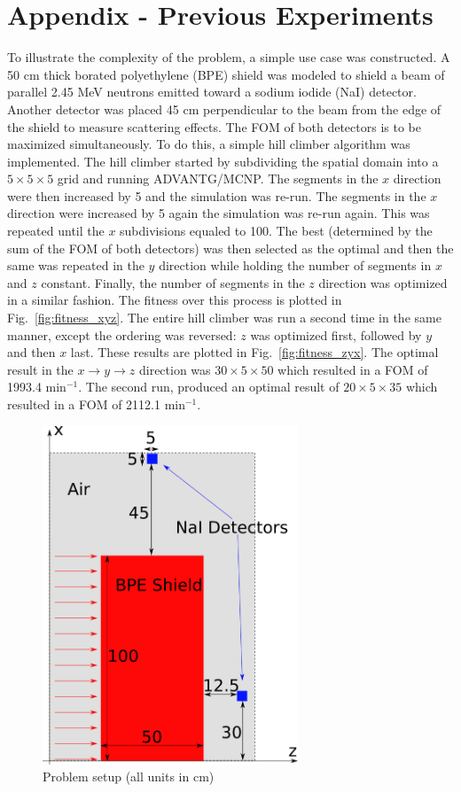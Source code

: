 \documentclass{article}
\begin{document}
\section{Appendix - Previous Experiments}\label{sec:apdx}
To illustrate the complexity of the problem, a simple use case was constructed. A 50 cm thick borated polyethylene (BPE) shield was modeled to shield a beam of parallel 2.45 MeV neutrons emitted toward a sodium iodide (NaI) detector. Another detector was placed 45 cm perpendicular to the beam from the edge of the shield to measure scattering effects. The FOM of both detectors is to be maximized simultaneously. To do this, a simple hill climber algorithm was implemented. The hill climber started by subdividing the spatial domain into a $5 \times 5 \times 5$ grid and running ADVANTG/MCNP. The segments in the $x$ direction were then increased by 5 and the simulation was re-run. The segments in the $x$ direction were increased by 5 again the simulation was re-run again. This was repeated until the $x$ subdivisions equaled to 100. The best (determined by the sum of the FOM of both detectors) was then selected as the optimal and then the same was repeated in the $y$ direction while holding the number of segments in $x$ and $z$ constant. Finally, the number of segments in the $z$ direction was optimized in a similar fashion. The fitness over this process is plotted in Fig.~\ref{fig:fitness_xyz}. The entire hill climber was run a second time in the same manner, except the ordering was reversed: $z$ was optimized first, followed by $y$ and then $x$ last. These results are plotted in Fig.~\ref{fig:fitness_zyx}. The optimal result in the $x \rightarrow y \rightarrow z$ direction was $30 \times 5 \times 50$ which resulted in a FOM of 1993.4 min$^{-1}$. The second run, produced an optimal result of $20 \times 5 \times 35$ which resulted in a FOM of 2112.1 min$^{-1}$.

\begin{figure}
    \centering
    \includegraphics[width=3.0in]{probsetup}
    \caption{Problem setup (all units in cm)}
    \label{fig:probsetup}
\end{figure}
\end{document}
